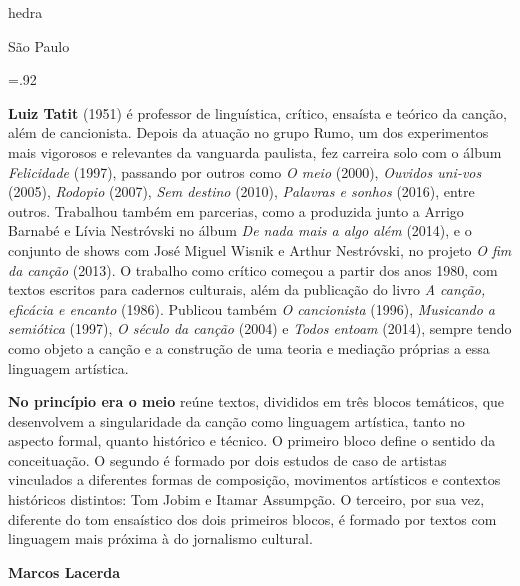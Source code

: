               \newfontfamily{}
              {\fontsize{30}{40}\selectfont \timesnewroman hedra}
              
              \medskip

              {\selectfont\minion\small
              São Paulo \quad\the\year}
\endgroup
\pagebreak

\begingroup 

\footnotesize\parindent0pt\parskip5pt\thispagestyle{empty} 
\vspace*{.1\textheight}\mbox{} \vfill
\baselineskip=.92\baselineskip
\thispagestyle{empty}

\textbf{Luiz Tatit} (1951) é professor de linguística, crítico, ensaísta e teórico da canção, além de cancionista. Depois da atuação no grupo Rumo, um dos experimentos mais vigorosos e relevantes da vanguarda paulista, fez carreira solo com o álbum \textit{Felicidade} (1997), passando por outros como \textit{O meio} (2000), \textit{Ouvidos uni-vos} (2005), \textit{Rodopio} (2007), \textit{Sem destino} (2010), \textit{Palavras e sonhos} (2016), entre outros. Trabalhou também em parcerias, como a produzida junto a Arrigo Barnabé e Lívia Nestróvski no álbum \textit{De nada mais a algo além} (2014), e o conjunto de shows com José Miguel Wisnik e Arthur Nestróvski, no projeto \textit{O fim da canção} (2013). O trabalho como crítico começou a partir dos anos 1980, com textos escritos para cadernos culturais, além da publicação do livro \textit{A canção, eficácia e encanto} (1986). Publicou também \textit{O cancionista} (1996), \textit{Musicando a semiótica} (1997), \textit{O século da canção} (2004) e \textit{Todos entoam} (2014), sempre tendo como objeto a canção e a construção de uma teoria e mediação próprias a essa linguagem artística.

\textbf{No princípio era o meio} reúne textos, divididos em três blocos temáticos, que desenvolvem a singularidade da canção como linguagem artística, tanto no aspecto formal, quanto histórico e técnico. O primeiro bloco define o sentido da conceituação. O segundo é formado por dois estudos de caso de artistas vinculados a diferentes formas de composição, movimentos artísticos e contextos históricos distintos: Tom Jobim e Itamar Assumpção. O terceiro, por sua vez, diferente do tom ensaístico dos dois primeiros blocos, é formado por textos com linguagem mais próxima à do jornalismo cultural.

\textbf{Marcos Lacerda} \lipsum[3]

